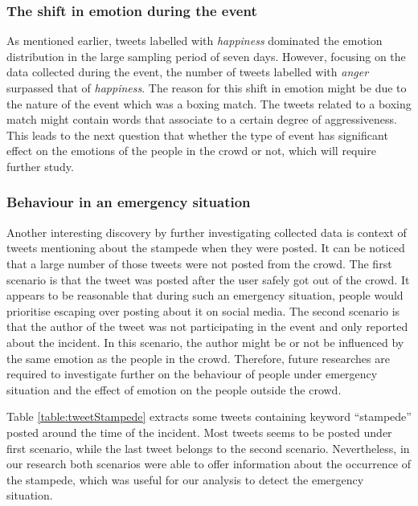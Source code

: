 \subsubsection{The shift in emotion during the event}
As mentioned earlier, tweets labelled with \textit{happiness} dominated the emotion distribution in the large sampling period of seven days. However, focusing on the data collected during the event, the number of tweets labelled with \textit{anger} surpassed that of \textit{happiness}. The reason for this shift in emotion might be due to the nature of the event which was a boxing match. The tweets related to a boxing match might contain words that associate to a certain degree of aggressiveness. This leads to the next question that whether the type of event has significant effect on the emotions of the people in the crowd or not, which will require further study.

\subsubsection{Behaviour in an emergency situation}
Another interesting discovery by further investigating collected data is context of tweets mentioning about the stampede when they were posted. It can be noticed that a large number of those tweets were not posted from the crowd. The first scenario is that the tweet was posted after the user safely got out of the crowd. It appears to be reasonable that during such an emergency situation, people would prioritise escaping over posting about it on social media. The second scenario is that the author of the tweet was not participating in the event and only reported about the incident. In this scenario, the author might be or not be influenced by the same emotion as the people in the crowd. Therefore, future researches are required to investigate further on the behaviour of people under emergency situation and the effect of emotion on the people outside the crowd.

Table \ref{table:tweetStampede} extracts some tweets containing keyword ``stampede'' posted around the time of the incident. Most tweets seems to be posted under first scenario, while the last tweet belongs to the second scenario. Nevertheless, in our research both scenarios were able to offer information about the occurrence of the stampede, which was useful for our analysis to detect the emergency situation.

